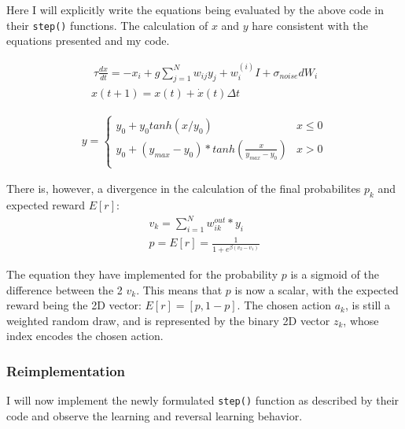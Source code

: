 \documentclass[11pt]{article}
\begin{document}
Here I will explicitly write the equations being evaluated by the above
code in their \texttt{step()} functions. The calculation of \(x\) and
\(y\) hare consistent with the equations presented and my code.

\begin{align}
\ \tau\frac{dx}{dt}= -x_i + g \sum_{j=1}^N w_{ij} y_j + w_i^{(i)}I + \sigma_{noise}dW_i \\
x(t + 1) = x(t) + \dot{x}(t)\Delta t
\end{align}

\begin{align}
y=   \left\{
\begin{array}{ll}
      y_0 + y_0 tanh(x/y_0) & x \leq 0   \\
      y_0 + (y_{max} - y_0)*tanh(\frac{x}{y_{max}- y_0}) & x > 0 \\
\end{array} 
\right.
\end{align}

There is, however, a divergence in the calculation of the final
probabilites \(p_k\) and expected reward \(E[r]\): \begin{align}
v_k = \sum_{i=1}^N w^{out}_{ik} * y_i \\
p = E[r] = \frac{1}{1 + e^{\beta (v_2 - v_1)}}
\end{align}

The equation they have implemented for the probability \(p\) is a
sigmoid of the difference between the 2 \(v_k\). This means that \(p\)
is now a scalar, with the expected reward being the 2D vector:
\(E[r]=[p, 1-p]\). The chosen action \(a_k\), is still a weighted random
draw, and is represented by the binary 2D vector \(z_k\), whose index
encodes the chosen action.

\hypertarget{reimplementation}{%
\subsubsection{Reimplementation}\label{reimplementation}}

I will now implement the newly formulated \texttt{step()} function as
described by their code and observe the learning and reversal learning
behavior.
\end{document}

